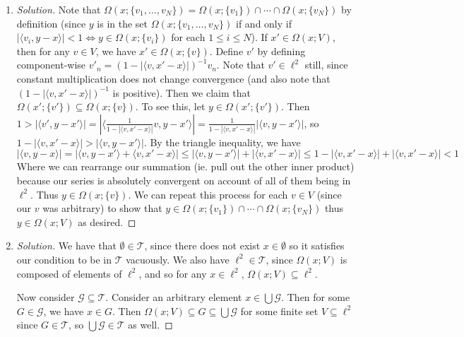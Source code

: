 \documentclass{article}
\begin{document}
\begin{enumerate}
	\item \begin{proof}[Solution]\let\qed\relax
		Note that $\Omega(x;\{v_1,\dots,v_N\}) =
		\Omega(x;\{v_1\}) \cap \cdots \cap \Omega(x;\{v_N\})$
		by definition (since $y$ is in the set $\Omega(x;\{v_1,\dots,v_N\})$
		if and only if $|\langle v_i, y-x\rangle| < 1 \Leftrightarrow y \in \Omega(x;\{v_i\})$
		for each $1 \leq i \leq N$).
		If $x' \in \Omega(x;V)$, then for any $v \in V$,
		we have $x' \in \Omega(x;\{v\})$.
		Define $v'$ by defining component-wise $v'_n = (1-|\langle v, x' - x\rangle|)^{-1}v_n$.
		Note that $v' \in \ell^2$ still, since constant
		multiplication does not change convergence
		(and also note that $(1-|\langle v, x' - x\rangle|)^{-1}$
		is positive).
		Then we claim that $\Omega(x';\{v'\}) \subseteq \Omega(x;\{v\})$.
		To see this, let $y \in \Omega(x';\{v'\})$.
		Then $1> |\langle v', y-x'\rangle| =
		|\langle \frac{1}{1-|\langle v, x' - x\rangle|}v, y-x'\rangle|
		= \frac{1}{1-|\langle v, x' - x\rangle|}|\langle v, y-x'\rangle|$,
		so $1-|\langle v,x'-x\rangle| > |\langle v, y-x' \rangle|$.
		By the triangle inequality, we have
		\[
			|\langle v, y-x \rangle|  = |\langle v, y-x'\rangle + \langle v, x' - x \rangle|
			\leq |\langle v, y-x'\rangle| + |\langle v, x' - x \rangle|
			\leq 1 - |\langle v, x' - x\rangle| + |\langle v, x' - x \rangle| < 1
		\]
		Where we can rearrange our summation (ie. pull out the other inner product)
		because our series is absolutely convergent on account
		of all of them being in $\ell^2$.
		Thus $y \in \Omega(x;\{v\})$.
		We can repeat this process for each $v \in V$
		(since our $v$ was arbitrary)
		to show that $y \in \Omega(x;\{v_1\}) \cap \cdots \cap \Omega(x;\{v_N\})$
		thus $y \in \Omega(x;V)$ as desired.
	\end{proof}
	\item \begin{proof}[Solution]\let\qed\relax
		We have that $\emptyset \in \mathcal{T}$,
		since there does not exist $x \in \emptyset$ so it
		satisfies our condition to be in $\mathcal{T}$ vacuously.
		We also have $\ell^2 \in \mathcal{T}$,
		since $\Omega(x;V)$ is composed of elements of $\ell^2$,
		and so for any $x \in \ell^2$, $\Omega(x;V) \subseteq \ell^2$.
		
		Now consider $\mathcal{G} \subseteq \mathcal{T}$.
		Consider an arbitrary element $x \in \bigcup \mathcal{G}$.
		Then for some $G \in \mathcal{G}$, we have $x \in G$.
		Then $\Omega(x;V) \subseteq G \subseteq \bigcup\mathcal{G}$
		for some finite set $V \subseteq \ell^2$ since $G \in \mathcal{T}$,
		so $\bigcup \mathcal{G} \in \mathcal{T}$ as well.


\end{proof}
\end{enumerate}
\end{document}
